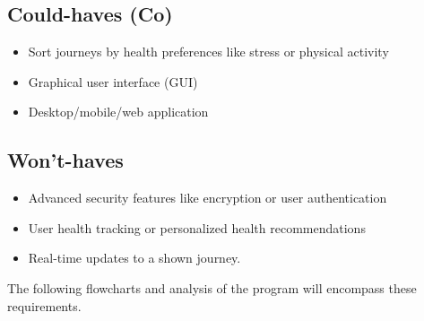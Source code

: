 \subsection{Could-haves (Co)}\label{subsec:could-haves}

\begin{itemize}
    \item Sort journeys by health preferences like stress or physical activity
    \item Graphical user interface (GUI)
    \item Desktop/mobile/web application
\end{itemize}

\subsection{Won't-haves}\label{subsec:wont-haves}

\begin{itemize}
    \item Advanced security features like encryption or user authentication
    \item User health tracking or personalized health recommendations
    \item Real-time updates to a shown journey.
\end{itemize}

The following flowcharts and analysis of the program will encompass these requirements.
